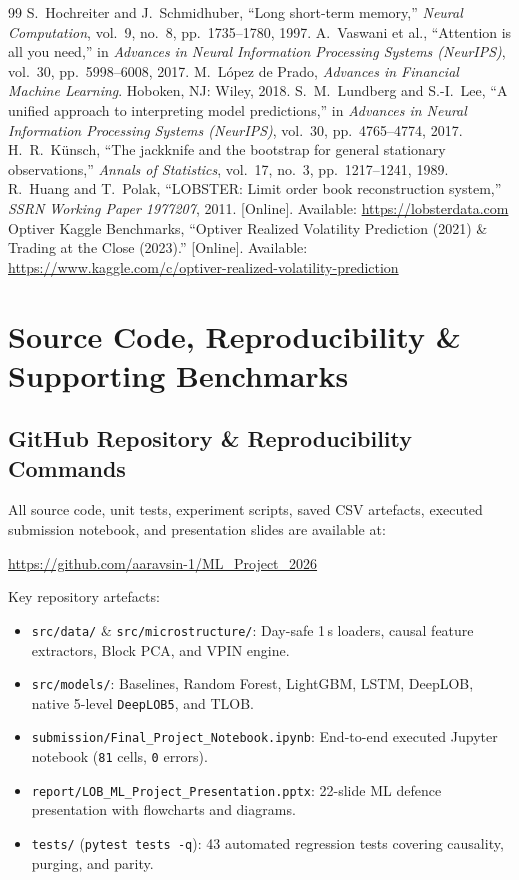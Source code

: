 \documentclass[12pt,a4paper,oneside]{report}
\newcommand{\code}[1]{\texttt{#1}}
\begin{document}
\begin{thebibliography}{99}
 S.~Hochreiter and J.~Schmidhuber, ``Long short-term memory,'' \emph{Neural Computation}, vol.~9, no.~8, pp.~1735--1780, 1997.
 A.~Vaswani et al., ``Attention is all you need,'' in \emph{Advances in Neural Information Processing Systems (NeurIPS)}, vol.~30, pp.~5998--6008, 2017.
 M.~L\'opez de Prado, \emph{Advances in Financial Machine Learning}. Hoboken, NJ: Wiley, 2018.
 S.~M.~Lundberg and S.-I.~Lee, ``A unified approach to interpreting model predictions,'' in \emph{Advances in Neural Information Processing Systems (NeurIPS)}, vol.~30, pp.~4765--4774, 2017.
 H.~R.~K\"unsch, ``The jackknife and the bootstrap for general stationary observations,'' \emph{Annals of Statistics}, vol.~17, no.~3, pp.~1217--1241, 1989.
 R.~Huang and T.~Polak, ``LOBSTER: Limit order book reconstruction system,'' \emph{SSRN Working Paper 1977207}, 2011. [Online]. Available: \url{https://lobsterdata.com}
 Optiver Kaggle Benchmarks, ``Optiver Realized Volatility Prediction (2021) \& Trading at the Close (2023).'' [Online]. Available: \url{https://www.kaggle.com/c/optiver-realized-volatility-prediction}
\end{thebibliography}

\appendix
\chapter{Source Code, Reproducibility \& Supporting Benchmarks}

\section{GitHub Repository \& Reproducibility Commands}
All source code, unit tests, experiment scripts, saved CSV artefacts, executed submission notebook, and presentation slides are available at:
\begin{center}
  \url{https://github.com/aaravsin-1/ML_Project_2026}
\end{center}
Key repository artefacts:
\begin{itemize}
  \item \code{src/data/} \& \code{src/microstructure/}: Day-safe 1\,s loaders, causal feature extractors, Block PCA, and VPIN engine.
  \item \code{src/models/}: Baselines, Random Forest, LightGBM, LSTM, DeepLOB, native 5-level \code{DeepLOB5}, and TLOB.
  \item \code{submission/Final\_Project\_Notebook.ipynb}: End-to-end executed Jupyter notebook (\code{81} cells, \code{0} errors).
  \item \code{report/LOB\_ML\_Project\_Presentation.pptx}: 22-slide ML defence presentation with flowcharts and diagrams.
  \item \code{tests/} (\code{pytest tests -q}): 43 automated regression tests covering causality, purging, and parity.
\end{itemize}
\end{document}
